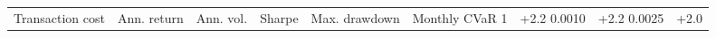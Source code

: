\begin{tabular}{rlllllll}
\toprule
Transaction cost & Ann. return & Ann. vol. & Sharpe & Max. drawdown & Monthly CVaR 1%
 & +2.2%
0.0010 & +2.2%
0.0025 & +2.0%
\bottomrule
\end{tabular}
